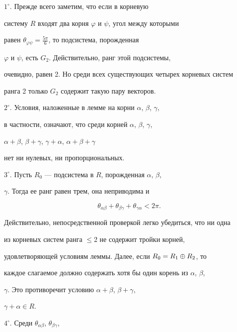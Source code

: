 \begin{pf} $1^\circ$. Прежде всего заметим, что если в корневую


систему $R$ входят два корня $\varphi $ и $\psi $, угол между которыми


равен $\theta_{\varphi\psi}=\frac{5\pi}6$, то подсистема, порожденная


$\varphi$ и $\psi$, есть $G_2$. Действительно, ранг этой подсистемы,


очевидно, равен 2. Но среди всех существующих четырех корневых систем


ранга 2 только $G_2$ содержит такую пару векторов.





$2^\circ$. Условия, наложенные в лемме на корни $\alpha$, $\beta$, $\gamma$,


в частности, означают, что среди корней $\alpha$, $\beta$, $\gamma$,


$\alpha+\beta$, $\beta+\gamma$, $\gamma+\alpha$, $\alpha+\beta+\gamma$


нет ни нулевых, ни пропорциональных.





$3^\circ$. Пусть $R_0$ --- подсистема в $R$, порожденная $\alpha$, $\beta$,


$\gamma$. Тогда ее ранг равен трем, она неприводима и


\begin{equation}


\theta_{\alpha\beta}+\theta_{\beta\gamma}+\theta_{\gamma\alpha}<2\pi.


\end{equation}


Действительно, непосредственной проверкой легко убедиться, что ни одна


из корневых систем ранга $\le$2 не содержит тройки корней,


удовлетворяющей условиям леммы. Далее, если $R_0=\linebreak R_1\oplus R_2$, то


каждое слагаемое должно содержать хотя бы один корень из $\alpha$, $\beta$,


$\gamma$. Это противоречит условию $\alpha+\beta$, $\beta+\gamma$,


$\gamma+\alpha\in R$.





$4^\circ$. Среди $\theta_{\alpha \beta }$, $\theta_{\beta \gamma }$,



\end{pf}
